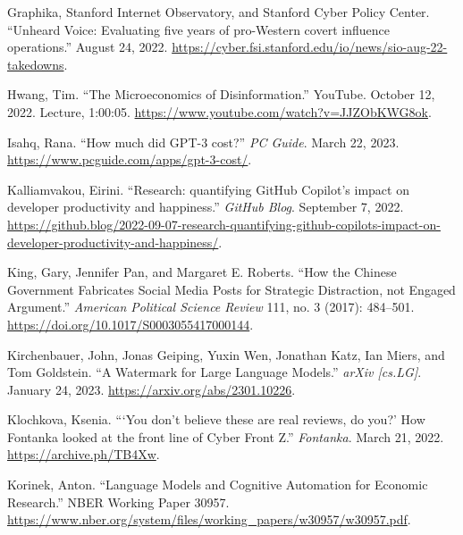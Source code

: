 \documentclass{article}
\begin{document}
\begin{thebibliography}{9}
  Graphika, Stanford Internet Observatory, and Stanford Cyber Policy Center. ``Unheard Voice: Evaluating five years of pro-Western covert influence operations.'' August 24, 2022. \href{https://cyber.fsi.stanford.edu/io/news/sio-aug-22-takedowns}{https://cyber.fsi.stanford.edu/io/news/sio-aug-22-takedowns}.

  Hwang, Tim. ``The Microeconomics of Disinformation.'' YouTube. October 12, 2022. Lecture, 1:00:05. \href{https://www.youtube.com/watch?v=JJZObKWG8ok}{https://www.youtube.com/watch?v=JJZObKWG8ok}.

  Isahq, Rana. ``How much did GPT-3 cost?'' \textit{PC Guide}. March 22, 2023. \href{https://www.pcguide.com/apps/gpt-3-cost/}{https://www.pcguide.com/apps/gpt-3-cost/}. 

  Kalliamvakou, Eirini. ``Research: quantifying GitHub Copilot's impact on developer productivity and happiness.'' \textit{GitHub Blog}. September 7, 2022. \href{https://github.blog/2022-09-07-research-quantifying-github-copilots-impact-on-developer-productivity-and-happiness/}{https://github.blog/2022-09-07-research-quantifying-github-copilots-impact-on-developer-productivity-and-happiness/}. 

  King, Gary, Jennifer Pan, and Margaret E. Roberts. ``How the Chinese Government Fabricates Social Media Posts for Strategic Distraction, not Engaged Argument.'' \textit{American Political Science Review} 111, no. 3 (2017): 484–501. \href{https://doi.org/10.1017/S0003055417000144}{https://doi.org/10.1017/S0003055417000144}. 

  Kirchenbauer, John, Jonas Geiping, Yuxin Wen, Jonathan Katz, Ian Miers, and Tom Goldstein. ``A Watermark for Large Language Models.'' \textit{arXiv [cs.LG]}. January 24, 2023. \href{https://arxiv.org/abs/2301.10226}{https://arxiv.org/abs/2301.10226}. 

  Klochkova, Ksenia. ```You don't believe these are real reviews, do you?' How Fontanka looked at the front line of Cyber Front Z.'' \textit{Fontanka}. March 21, 2022. \href{https://archive.ph/TB4Xw}{https://archive.ph/TB4Xw}.

  Korinek, Anton. ``Language Models and Cognitive Automation for Economic Research.'' NBER Working Paper 30957. \href{https://www.nber.org/system/files/working_papers/w30957/w30957.pdf}{https://www.nber.org/system/files/working\_papers/w30957/w30957.pdf}. 


\end{thebibliography}
\end{document}
